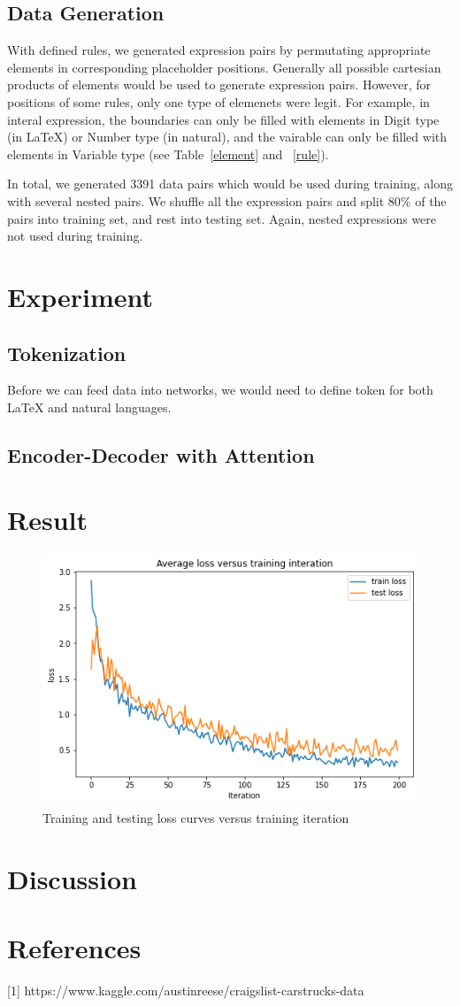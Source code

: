 \documentclass{article}
\begin{document}
\subsection{Data Generation}
With defined rules, we generated expression pairs by permutating appropriate elements in corresponding placeholder positions. Generally all possible cartesian products of elements would be used to generate expression pairs. However, for positions of some rules, only one type of elemenets were legit. For example, in interal expression, the boundaries can only be filled with elements in Digit type (in LaTeX) or Number type (in natural), and the vairable can only be filled with elements in Variable type (see Table~\ref{element} and ~\ref{rule}). \par 
In total, we generated 3391 data pairs which would be used during training, along with several nested pairs. We shuffle all the expression pairs and split 80\% of the pairs into training set, and rest into testing set. Again, nested expressions were not used during training. 
%
\section{Experiment}
%
\subsection{Tokenization}
Before we can feed data into networks, we would need to define token for both LaTeX and natural languages. 
%
\subsection{Encoder-Decoder with Attention}
%
%
\section{Result}
\begin{figure}[h]
  \centering
  \includegraphics[width=12cm]{../plot/loss_curve.png}
  \caption{Training and testing loss curves versus training iteration}
  \label{fig:loss}
\end{figure}
%
\section{Discussion}


    

\section*{References}

\small

[1] https://www.kaggle.com/austinreese/craigslist-carstrucks-data
\end{document}
